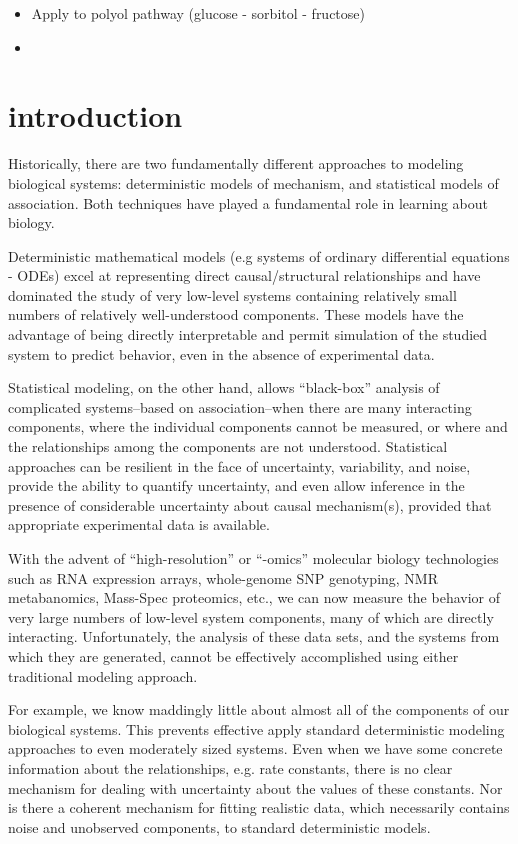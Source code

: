 \documentclass{beamer}
\begin{document}
\begin{itemize}
\item Apply to polyol pathway (glucose - sorbitol - fructose)
\item 
\end{itemize}

\appendix

\section{introduction}

Historically, there are two fundamentally different approaches to
modeling biological systems: deterministic models of mechanism, and
statistical models of association. Both techniques have played a
fundamental role in learning about biology.
  
  Deterministic mathematical models (e.g systems of ordinary
  differential equations - ODEs) excel at representing direct
  causal/structural relationships and have dominated the study of
  very low-level systems containing relatively small numbers of
  relatively well-understood components.  These models have the
  advantage of being directly interpretable and permit simulation of
  the studied system to predict behavior, even in the absence of
  experimental data.
  
  Statistical modeling, on the other hand, allows ``black-box''
  analysis of complicated systems--based on association--when there are
  many interacting components, where the individual components cannot
  be measured, or where and the relationships among the components are
  not understood.  Statistical approaches can be resilient in the face
  of uncertainty, variability, and noise, provide the ability to
  quantify uncertainty, and even allow inference in the presence of
  considerable uncertainty about causal mechanism(s), provided that
  appropriate experimental data is available.
  
  With the advent of ``high-resolution'' or ``-omics'' molecular
  biology technologies such as RNA expression arrays, whole-genome SNP
  genotyping, NMR metabanomics, Mass-Spec proteomics, etc., we can now
  measure the behavior of very large numbers of low-level system
  components, many of which are directly interacting. Unfortunately,
  the analysis of these data sets, and the systems from which they are
  generated, cannot be effectively accomplished using either
  traditional modeling approach.
  
  For example, we know maddingly little about almost all of the
  components of our biological systems.  This prevents effective apply
  standard deterministic modeling approaches to even moderately sized
  systems.  Even when we have some concrete information about the
  relationships, e.g. rate constants, there is no clear mechanism for
  dealing with uncertainty about the values of these constants.  Nor
  is there a coherent mechanism for fitting realistic data, which
  necessarily contains noise and unobserved components, to standard
  deterministic models.
  
\end{document}
